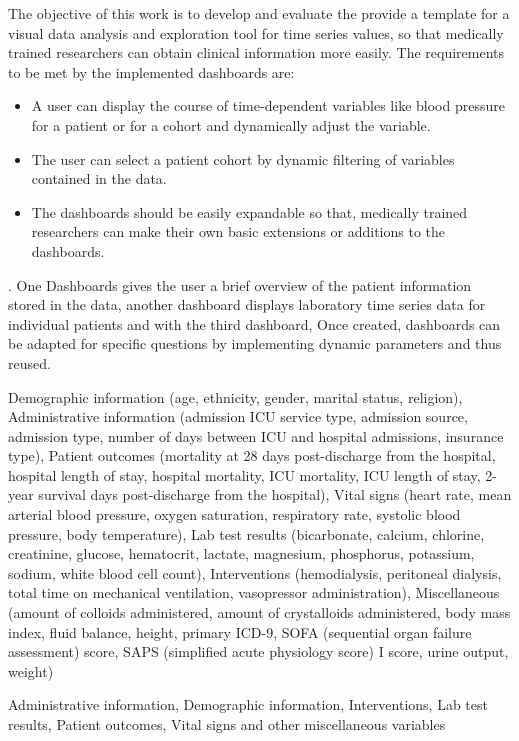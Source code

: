 The objective of this work is to develop and evaluate the provide a template for a visual data analysis
and exploration tool for time series values, so that medically trained researchers can obtain clinical
information more easily. The requirements to be met by the implemented dashboards are:
\begin{itemize}
\item A user can display the course of time-dependent variables like blood pressure for a patient or for a cohort and dynamically adjust the variable.
\item The user can select a patient cohort by dynamic filtering of variables contained in the data.
\item The dashboards should be easily expandable so that, medically trained researchers can make their own basic extensions or additions to the dashboards.
\end{itemize}

. One Dashboards gives the user a brief overview of the patient information stored in the data, another dashboard displays laboratory time series data for individual patients and with the third dashboard,  Once created, dashboards can be adapted for specific questions by implementing dynamic parameters and thus reused.


Demographic information (age, ethnicity, gender, marital status, religion), Administrative information (admission ICU service type, admission source, admission type, number of days between ICU and hospital admissions, insurance type), Patient outcomes (mortality at 28 days post-discharge from the hospital, hospital length of stay, hospital mortality, ICU mortality, ICU length of stay, 2-year survival days post-discharge from the hospital), Vital signs (heart rate, mean arterial blood pressure, oxygen saturation, respiratory rate, systolic blood pressure, body temperature), Lab test results (bicarbonate, calcium, chlorine, creatinine, glucose, hematocrit, lactate, magnesium, phosphorus, potassium, sodium, white blood cell count), Interventions (hemodialysis, peritoneal dialysis, total time on mechanical ventilation, vasopressor administration), Miscellaneous (amount of colloids administered, amount of crystalloids administered, body mass index, fluid balance, height, primary ICD-9, SOFA (sequential organ failure assessment) score, SAPS (simplified acute physiology score) I score, urine output, weight)

Administrative information, Demographic information, Interventions, Lab test results, Patient outcomes, Vital signs and other miscellaneous variables 


